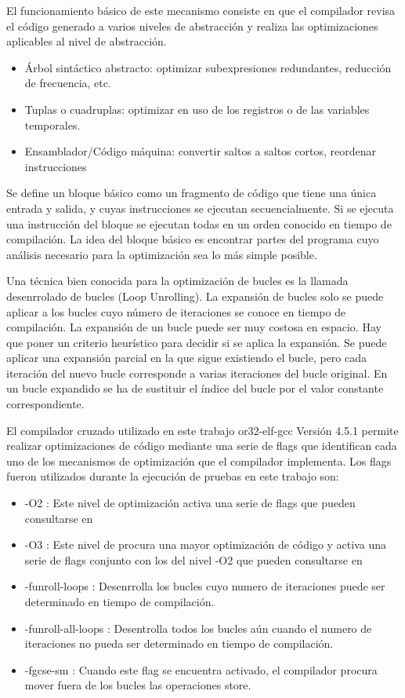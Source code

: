 El funcionamiento básico de este mecanismo consiste en que el compilador revisa el código generado a varios niveles de abstracción y realiza las
optimizaciones aplicables al nivel de abstracción.
\begin{itemize}
  	\item Árbol sintáctico abstracto: optimizar subexpresiones redundantes, reducción de frecuencia, etc.
	\item Tuplas o cuadruplas: optimizar en uso de los registros o de las variables temporales.
	\item Ensamblador/Código máquina: convertir saltos a saltos cortos, reordenar instrucciones
\end{itemize}

Se define un bloque básico como un fragmento de código que tiene una única entrada y salida, y cuyas instrucciones se ejecutan secuencialmente. Si se
ejecuta una instrucción del bloque se ejecutan todas en un orden conocido en tiempo de compilación. La idea del bloque básico es encontrar partes del programa
cuyo análisis necesario para la optimización sea lo más simple posible.

Una técnica bien conocida para la optimización de bucles es la llamada desenrrolado de bucles (Loop Unrolling). La expansión de bucles solo se puede
aplicar a los bucles cuyo número de iteraciones se conoce en tiempo de compilación. La expansión de un bucle puede ser muy costosa en espacio. Hay
que poner un criterio heurístico para decidir si se aplica la expansión. Se puede aplicar una expansión parcial en la que sigue existiendo el bucle,
pero cada iteración del nuevo bucle corresponde a varias iteraciones del bucle original. En un bucle expandido se ha de sustituir el índice del bucle 
por el valor constante correspondiente.

El compilador cruzado utilizado en este trabajo or32-elf-gcc Versión 4.5.1 permite realizar optimizaciones de código mediante una serie de flags que
identifican cada uno de los mecanismos de optimización que el compilador implementa. Los flags fueron utilizados durante la ejecución de pruebas en
este trabajo son:

\begin{itemize}
  	\item -O2 : Este nivel de optimización activa una serie de flags que pueden consultarse en \cite{etiqueta_OptGcc}
	\item -O3 : Este nivel de procura una mayor optimización de código y activa una serie de flags conjunto con los del nivel -O2 que pueden consultarse
	en \cite{etiqueta_OptGcc}
	\item -funroll-loops : Desenrrolla los bucles cuyo numero de iteraciones puede ser determinado en tiempo de compilación. 
	\item -funroll-all-loops : Desentrolla todos los bucles aún cuando el numero de iteraciones no pueda ser determinado en tiempo de compilación. 
	\item -fgcse-sm : Cuando este flag se encuentra activado, el compilador procura mover fuera de los bucles las operaciones store.
\end{itemize}

